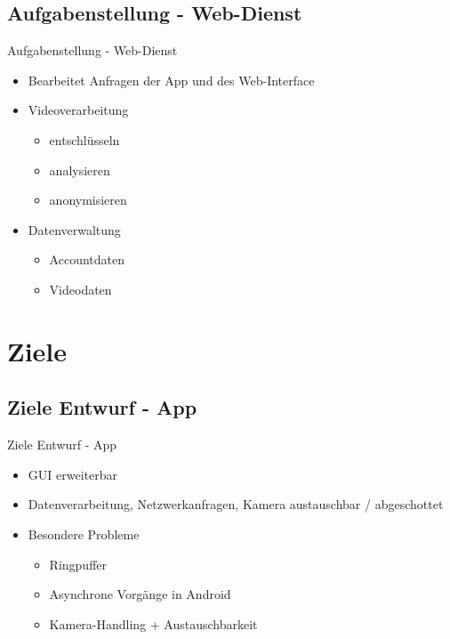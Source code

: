 \documentclass[19pt]{beamer}
\begin{document}
\subsection{Aufgabenstellung - Web-Dienst}
\begin{frame}{Aufgabenstellung - Web-Dienst}
	\begin{itemize}
		\item Bearbeitet Anfragen der App und des Web-Interface
		\item Videoverarbeitung
			\begin{itemize}
				\item entschl\"usseln
				\item analysieren
				\item anonymisieren
			\end{itemize}
		\item Datenverwaltung
			\begin{itemize}
				\item Accountdaten
				\item Videodaten
			\end{itemize}
	\end{itemize}
\end{frame}


\section{Ziele}
\subsection{Ziele Entwurf - App}
\begin{frame}{Ziele Entwurf - App}
	\begin{itemize}
		\item GUI erweiterbar
		\item Datenverarbeitung, Netzwerkanfragen, Kamera austauschbar / abgeschottet
		\item Besondere Probleme
		\begin{itemize}
			\item Ringpuffer
			\item Asynchrone Vorgänge in Android
			\item Kamera-Handling + Austauschbarkeit
		\end{itemize}
	\end{itemize}
\end{frame}
\end{document}
